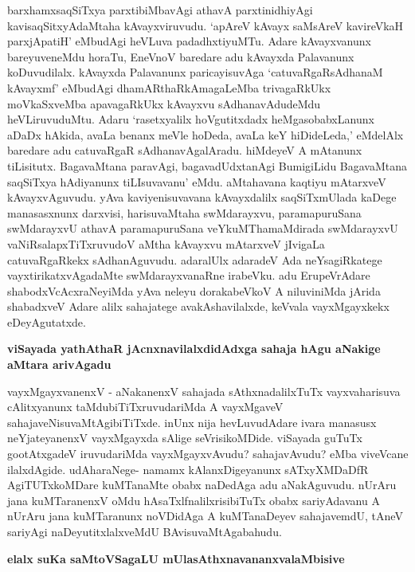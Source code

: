 barxhamxsaqSiTxya parxtibiMbavAgi athavA parxtinidhiyAgi kavisaqSitxyAdaMtaha kAvayxviruvudu. `apAreV kAvayx saMsAreV kavireVkaH parxjApatiH' eMbudAgi heVLuva padadhxtiyuMTu. Adare kAvayxvanunx bareyuveneMdu horaTu, EneVnoV baredare adu kAvayxda Palavanunx koDuvudilalx. kAvayxda Palavanunx paricayisuvAga `catuvaRgaRsAdhanaM kAvayxmf' eMbudAgi dhamARthaRkAmagaLeMba trivagaRkUkx moVkaSxveMba apavagaRkUkx kAvayxvu sAdhanavAdudeMdu heVLiruvuduMtu. Adaru `rasetxyalilx hoVgutitxdadx heMgasobabxLanunx aDaDx hAkida, avaLa benanx meVle hoDeda, avaLa keY hiDideLeda,' eMdelAlx baredare adu catuvaRgaR sAdhanavAgalAradu. hiMdeyeV A mAtanunx tiLisitutx. BagavaMtana paravAgi, bagavadUdxtanAgi BumigiLidu BagavaMtana saqSiTxya hAdiyanunx tiLIsuvavanu' eMdu. aMtahavana kaqtiyu mAtarxveV kAvayxvAguvudu. yAva kaviyenisuvavana kAvayxdalilx saqSiTxmUlada kaDege manasasxnunx darxvisi, harisuvaMtaha swMdarayxvu, paramapuruSana swMdarayxvU athavA paramapuruSana veYkuMThamaMdirada swMdarayxvU vaNiRsalapxTiTxruvudoV aMtha kAvayxvu mAtarxveV jIvigaLa catuvaRgaRkekx sAdhanAguvudu. adaralUlx adaradeV Ada neYsagiRkatege vayxtirikatxvAgadaMte swMdarayxvanaRne irabeVku. adu ErupeVrAdare shabodxVcAcxraNeyiMda yAva neleyu dorakabeVkoV A niluviniMda jArida shabadxveV Adare alilx sahajatege avakAshavilalxde, keVvala vayxMgayxkekx eDeyAgutatxde.

{\bf viSayada yathAthaR jAcnxnavilalxdidAdxga sahaja hAgu aNakige aMtara arivAgadu}

vayxMgayxvanenxV - aNakanenxV sahajada sAthxnadalilxTuTx vayxvaharisuva cAlitxyanunx taMdubiTiTxruvudariMda A vayxMgaveV sahajaveNisuvaMtAgibiTiTxde. inUnx nija hevLuvudAdare ivara manasusx neYjateyanenxV vayxMgayxda sAlige seVrisikoMDide. viSayada guTuTx gootAtxgadeV iruvudariMda vayxMgayxvAvudu? sahajavAvudu? eMba viveVcane ilalxdAgide. udAharaNege- namamx kAlanxDigeyanunx sATxyXMDaDfR AgiTUTxkoMDare kuMTanaMte obabx naDedAga adu aNakAguvudu. nUrAru jana kuMTaranenxV oMdu hAsaTxlfnalilxrisibiTuTx obabx sariyAdavanu A nUrAru jana kuMTaranunx noVDidAga A kuMTanaDeyev sahajavemdU, tAneV sariyAgi naDeyutitxlalxveMdU BAvisuvaMtAgabahudu.

{\bf elalx suKa saMtoVSagaLU mUlasAthxnavananxvalaMbisive}

